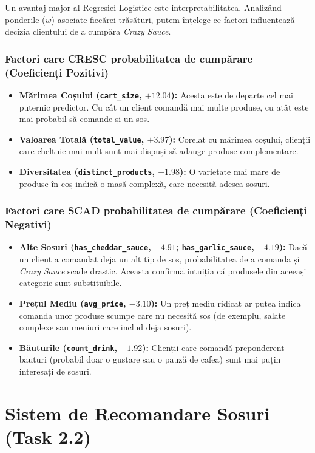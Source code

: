 \documentclass[12pt,a4paper]{article}
\begin{document}
Un avantaj major al Regresiei Logistice este interpretabilitatea. Analizând ponderile ($w$) asociate fiecărei trăsături, putem înțelege ce factori influențează decizia clientului de a cumpăra \textit{Crazy Sauce}.

\subsubsection*{Factori care CRESC probabilitatea de cumpărare (Coeficienți Pozitivi)}
\begin{itemize}
    \item \textbf{Mărimea Coșului (\texttt{cart\_size}, $+12.04$):} Acesta este de departe cel mai puternic predictor. Cu cât un client comandă mai multe produse, cu atât este mai probabil să comande și un sos.
    \item \textbf{Valoarea Totală (\texttt{total\_value}, $+3.97$):} Corelat cu mărimea coșului, clienții care cheltuie mai mult sunt mai dispuși să adauge produse complementare.
    \item \textbf{Diversitatea (\texttt{distinct\_products}, $+1.98$):} O varietate mai mare de produse în coș indică o masă complexă, care necesită adesea sosuri.
\end{itemize}

\subsubsection*{Factori care SCAD probabilitatea de cumpărare (Coeficienți Negativi)}
\begin{itemize}
    \item \textbf{Alte Sosuri (\texttt{has\_cheddar\_sauce}, $-4.91$; \texttt{has\_garlic\_sauce}, $-4.19$):} Dacă un client a comandat deja un alt tip de sos, probabilitatea de a comanda și \textit{Crazy Sauce} scade drastic. Aceasta confirmă intuiția că produsele din aceeași categorie sunt substituibile.
    \item \textbf{Prețul Mediu (\texttt{avg\_price}, $-3.10$):} Un preț mediu ridicat ar putea indica comanda unor produse scumpe care nu necesită sos (de exemplu, salate complexe sau meniuri care includ deja sosuri).
    \item \textbf{Băuturile (\texttt{count\_drink}, $-1.92$):} Clienții care comandă preponderent băuturi (probabil doar o gustare sau o pauză de cafea) sunt mai puțin interesați de sosuri.
\end{itemize}

\section{Sistem de Recomandare Sosuri (Task 2.2)}
\end{document}
